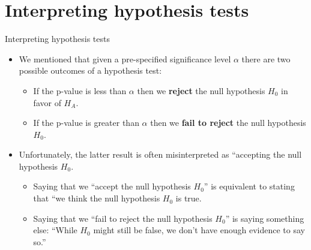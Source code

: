 \documentclass[
  ignorenonframetext,
]{beamer}
\providecommand{\tightlist}{%
  \setlength{\itemsep}{0pt}\setlength{\parskip}{0pt}}
\begin{document}
\section{Interpreting hypothesis
tests}\label{interpreting-hypothesis-tests}

\begin{frame}{Interpreting hypothesis tests}
\label{interpreting-hypothesis-tests-1}
\begin{itemize}
\item
  We mentioned that given a pre-specified significance level \(\alpha\)
  there are two possible outcomes of a hypothesis test:

  \begin{itemize}
  \tightlist
  \item
    If the p-value is less than \(\alpha\) then we \textbf{reject} the
    null hypothesis \(H_0\) in favor of \(H_A\).
  \item
    If the p-value is greater than \(\alpha\) then we \textbf{fail to
    reject} the null hypothesis \(H_0\).
  \end{itemize}
\item
  Unfortunately, the latter result is often misinterpreted as
  ``accepting the null hypothesis \(H_0\).

  \begin{itemize}
  \tightlist
  \item
    Saying that we ``accept the null hypothesis \(H_0\)'' is equivalent
    to stating that ``we think the null hypothesis \(H_0\) is true.
  \item
    Saying that we ``fail to reject the null hypothesis \(H_0\)'' is
    saying something else: ``While \(H_0\) might still be false, we
    don't have enough evidence to say so.''
  \end{itemize}
\end{itemize}
\end{frame}
\end{document}
